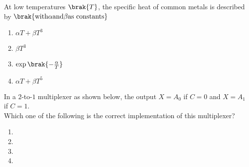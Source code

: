 \item At low temperatures $\brak{T}$, the specific heat of common metals is described by $\brak{\text{with} \alpha \text{and} \beta \text{as constants}}$
\begin{enumerate}
    \item $\alpha T + \beta T^3$
    \item $\beta T^3$
    \item $\exp\brak{-\frac{\alpha}{T}}$
    \item $\alpha T + \beta T^5$
\end{enumerate}

\item In a $2$-to-$1$ multiplexer as shown below, the output $X=A_0$ if $C=0$ and $X=A_1$ if $C=1$.\\

Which one of the following is the correct implementation of this multiplexer?
\begin{enumerate}
    \item 


\item 


\item 




\item 






\end{enumerate}

                                        




